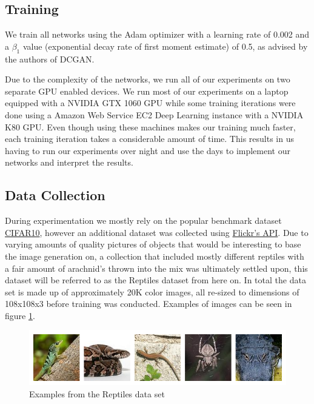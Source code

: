 \subsection{Training}
We train all networks using the Adam optimizer \cite{2014arXiv1412.6980K} with a learning rate of 0.002 and a $\beta_1$ value (exponential decay rate of first moment estimate) of 0.5, as advised by the authors of DCGAN.

Due to the complexity of the networks, we run all of our experiments on two separate GPU enabled devices. We run most of our experiments on a laptop equipped with a NVIDIA GTX 1060 GPU while some training iterations were done using a Amazon Web Service EC2 Deep Learning instance with a NVIDIA K80 GPU. Even though using these machines makes our training much faster, each training iteration takes a considerable amount of time. This results in us having to run our experiments over night and use the days to implement our networks and interpret the results. 

\subsection{Data Collection}

During experimentation we mostly rely on the popular benchmark dataset \href{https://www.cs.toronto.edu/~kriz/cifar.html}{CIFAR10}, however an additional dataset was collected using \href{https://www.flickr.com/services/api/}{Flickr's API}. Due to varying amounts of quality pictures of objects that would be interesting to base the image generation on, a collection that included mostly different reptiles with a fair amount of arachnid's thrown into the mix was ultimately settled upon, this dataset will be referred to as the Reptiles dataset from here on. In total the data set is made up of approximately 20K color images, all re-sized to dimensions of 108x108x3 before training was conducted. Examples of images can be seen in figure \ref{fig:reptiles}.


\begin{figure}[H]
\centering
\includegraphics[width=\textwidth]{figures/reptiles.png}
\caption{Examples from the Reptiles data set}
\label{fig:reptiles}
\end{figure}
